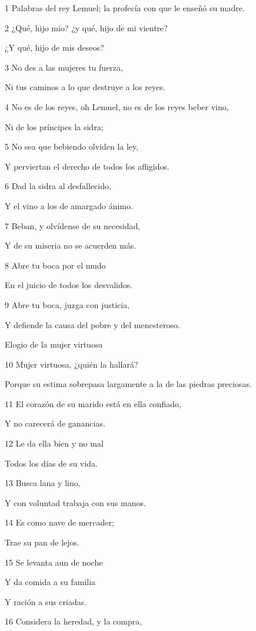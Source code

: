 \par 1 Palabras del rey Lemuel; la profecía con que le enseñó su madre.
\par 2 ¿Qué, hijo mío? ¿y qué, hijo de mi vientre?
\par ¿Y qué, hijo de mis deseos?
\par 3 No des a las mujeres tu fuerza,
\par Ni tus caminos a lo que destruye a los reyes.
\par 4 No es de los reyes, oh Lemuel, no es de los reyes beber vino,
\par Ni de los príncipes la sidra;
\par 5 No sea que bebiendo olviden la ley,
\par Y perviertan el derecho de todos los afligidos.
\par 6 Dad la sidra al desfallecido,
\par Y el vino a los de amargado ánimo.
\par 7 Beban, y olvídense de su necesidad,
\par Y de su miseria no se acuerden más.
\par 8 Abre tu boca por el mudo
\par En el juicio de todos los desvalidos.
\par 9 Abre tu boca, juzga con justicia,
\par Y defiende la causa del pobre y del menesteroso.
\par Elogio de la mujer virtuosa 
\par 10 Mujer virtuosa, ¿quién la hallará?
\par Porque su estima sobrepasa largamente a la de las piedras preciosas.
\par 11 El corazón de su marido está en ella confiado,
\par Y no carecerá de ganancias.
\par 12 Le da ella bien y no mal
\par Todos los días de su vida.
\par 13 Busca lana y lino,
\par Y con voluntad trabaja con sus manos.
\par 14 Es como nave de mercader;
\par Trae su pan de lejos.
\par 15 Se levanta aun de noche
\par Y da comida a su familia
\par Y ración a sus criadas.
\par 16 Considera la heredad, y la compra,
